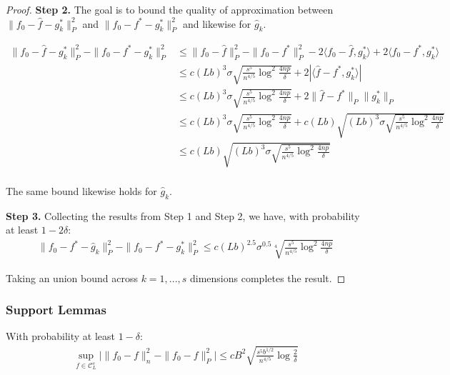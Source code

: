 \begin{proof}
\textbf{Step 2.} The goal is to bound the quality of approximation between $\| f_0 - \hat{f} - g^*_k \|_P^2$ and $\| f_0 - f^* - g^*_k \|_P^2$ and likewise for $\hat{g}_k$.

\begin{align*}
\| f_0 - \hat{f} - g^*_k \|_P^2 - \| f_0 - f^* - g^*_k\|_P^2 &\leq 
    \| f_0 - \hat{f} \|_P^2 - \|f_0 - f^*\|_P^2 - 2\langle f_0 - \hat{f}, g^*_k \rangle
   + 2 \langle f_0 - f^*, g^*_k \rangle \\
 &\leq c (Lb)^3 \sigma \sqrt{ \frac{s^5}{n^{4/5}} \log^2 \frac{4np}{\delta}} + 
    2 | \langle \hat{f} - f^*, g^*_k \rangle |  \\
 &\leq  c (Lb)^3 \sigma \sqrt{ \frac{s^5}{n^{4/5}} \log^2 \frac{4np}{\delta}} +
    2 \| \hat{f} - f^* \|_P \| g^*_k \|_P \\
&\leq  c (Lb)^3 \sigma \sqrt{ \frac{s^5}{n^{4/5}} \log^2 \frac{4np}{\delta}} +
   c (Lb) \sqrt{(Lb)^3\sigma \sqrt{ 
                   \frac{s^5}{n^{4/5}} \log^2 \frac{4np}{\delta}} }\\
&\leq  c (Lb) \sqrt{(Lb)^3\sigma \sqrt{ 
                   \frac{s^5}{n^{4/5}} \log^2 \frac{4np}{\delta}} }\\
\end{align*}

The same bound likewise holds for $\hat{g}_k$.

\textbf{Step 3.} Collecting the results from Step 1 and Step 2, we have, with probability at least $1-2\delta$:
\begin{align*}
\| f_0 - f^* - \hat{g}_k \|_P^2 - \|f_0 - f^* - g^*_k \|_P^2 \leq
   c (Lb)^{2.5} \sigma^{0.5} 
     \sqrt[4]{ \frac{s^5}{n^{4/5}} \log^2 \frac{4np}{\delta}} 
\end{align*}

Taking an union bound across $k=1,...,s$ dimensions completes the result.

\end{proof}








\subsubsection{Support Lemmas}


\begin{lemma}
\label{lem:uniform_convergence}
With probability at least $1-\delta$:
\begin{align*}
\sup_{f \in \mathcal{C}^s_L} \Big| \| f_0 - f \|^2_n - \|f_0 - f \|^2_P\Big| \leq
   c B^2 \sqrt{ \frac{s^5b^{1/2}}{n^{4/5}} \log \frac{2}{\delta}}
\end{align*}

\end{lemma}

